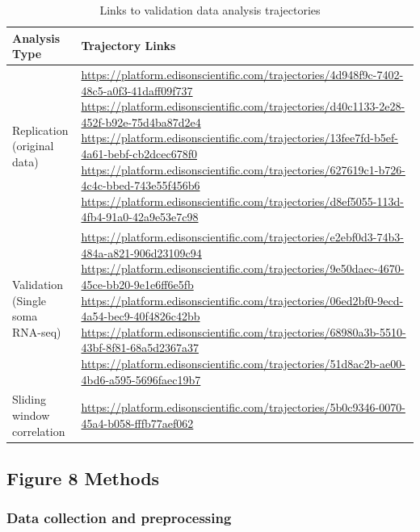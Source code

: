 \documentclass{article}
\begin{document}
\begin{table}[ht]
\centering
\caption{Links to validation data analysis trajectories}
\begin{tabular}{p{} p{}}
\hline
\textbf{Analysis Type} & \textbf{Trajectory Links} \\
\hline
Replication (original data) & 
\url{https://platform.edisonscientific.com/trajectories/4d948f9c-7402-48c5-a0f3-41daff09f737} \newline
\url{https://platform.edisonscientific.com/trajectories/d40c1133-2e28-452f-b92e-75d4ba87d2e4} \newline
\url{https://platform.edisonscientific.com/trajectories/13fee7fd-b5ef-4a61-bebf-cb2dcec678f0} \newline
\url{https://platform.edisonscientific.com/trajectories/627619c1-b726-4c4c-bbed-743e55f456b6} \newline
\url{https://platform.edisonscientific.com/trajectories/d8ef5055-113d-4fb4-91a0-42a9e53e7c98} \\
\hline
Validation (Single soma RNA-seq) & 
\url{https://platform.edisonscientific.com/trajectories/e2ebf0d3-74b3-484a-a821-906d23109c94} \newline
\url{https://platform.edisonscientific.com/trajectories/9e50daec-4670-45ce-bb20-9e1e6ff6e5fb} \newline
\url{https://platform.edisonscientific.com/trajectories/06ed2bf0-9ecd-4a54-bec9-40f4826c42bb} \newline
\url{https://platform.edisonscientific.com/trajectories/68980a3b-5510-43bf-8f81-68a5d2367a37} \newline
\url{https://platform.edisonscientific.com/trajectories/51d8ac2b-ae00-4bd6-a595-5696faec19b7} \\
\hline
Sliding window correlation & 
\url{https://platform.edisonscientific.com/trajectories/5b0c9346-0070-45a4-b058-fffb77aef062} \\
\hline
\end{tabular}
\label{tab:trajectories}
\end{table}

\subsection{Figure 8 Methods}

\subsubsection{Data collection and preprocessing}
\end{document}
